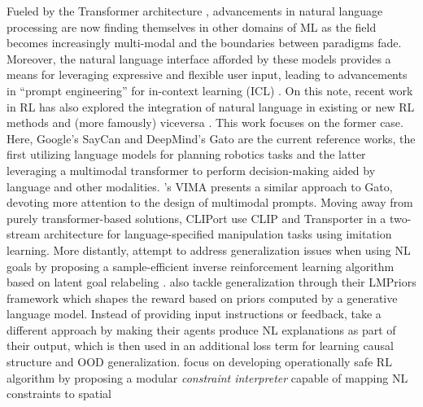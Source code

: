 \documentclass[../thesis-proposal/main.tex]{subfiles}
\begin{document}
Fueled by the Transformer architecture \citep{vaswani_attention_2017}, advancements in natural
language processing \citep{vaswani_attention_2017, devlin_bert_2019, brown_language_2020} are now
finding themselves in other domains of ML \citep{radford_learning_2021,
rombach_high-resolution_2022, dhariwal_jukebox_2020} as the field becomes increasingly multi-modal
\citep{baltrusaitis_multimodal_2019, xu_multimodal_2022} and the boundaries between paradigms fade.
Moreover, the natural language interface afforded by these models provides a means for leveraging
expressive and flexible user input, leading to advancements in ``prompt engineering'' for in-context
learning (ICL) \citep{dohan_language_2022, dosovitskiy_image_2022, reynolds_prompt_2021,
wei_chain--thought_2022, hertz_prompt--prompt_2022}. On this note, recent work in RL has also
explored the integration of natural language in existing or new RL methods
\citep{luketina_survey_2019} and (more famously) viceversa \citep{ouyang_training_2022}. This work
focuses on the former case. Here, Google's SayCan \citep{ahn_as_2022} and DeepMind's Gato
\citep{reed_generalist_2022} are the current reference works, the first utilizing language models
for planning robotics tasks and the latter leveraging a multimodal transformer to perform
decision-making aided by language and other modalities. 's VIMA presents
a similar approach to Gato, devoting more attention to the design of multimodal prompts. Moving away
from purely transformer-based solutions, CLIPort \citep{shridhar_cliport_2021} use CLIP
\citep{radford_learning_2021} and Transporter \citep{zeng_transporter_2021} in a two-stream
architecture for language-specified manipulation tasks using imitation learning. More distantly,
\citet{zhou_inverse_2021} attempt to address generalization issues when using NL goals by proposing
a sample-efficient inverse reinforcement learning algorithm based on latent goal relabeling
\citep{nair_visual_2018}.  also tackle generalization through their
LMPriors framework which shapes the reward \citep{ng_policy_1999} based on priors computed by
a generative language model. Instead of providing input instructions or feedback,
\citet{lampinen_tell_2022} take a different approach by making their agents produce NL explanations
as part of their output, which is then used in an additional loss term for learning causal structure
and OOD generalization.  focus on developing operationally safe RL algorithm
by proposing a modular \textit{constraint interpreter} capable of mapping NL constraints to spatial
\end{document}
